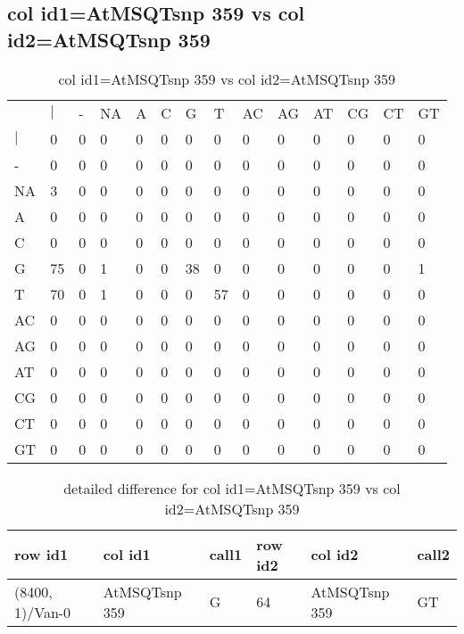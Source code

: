 \subsection{col id1=AtMSQTsnp 359 vs col id2=AtMSQTsnp 359}
\begin{center}
\begin{longtable}{|l|l|l|l|l|l|l|l|l|l|l|l|l|l|}
\caption{col id1=AtMSQTsnp 359 vs col id2=AtMSQTsnp 359} \label{table_dm686}\\
\hline
\\
\hline
&$|$&-&NA&A&C&G&T&AC&AG&AT&CG&CT&GT\\
$|$&0&0&0&0&0&0&0&0&0&0&0&0&0\\
-&0&0&0&0&0&0&0&0&0&0&0&0&0\\
NA&3&0&0&0&0&0&0&0&0&0&0&0&0\\
A&0&0&0&0&0&0&0&0&0&0&0&0&0\\
C&0&0&0&0&0&0&0&0&0&0&0&0&0\\
G&75&0&1&0&0&38&0&0&0&0&0&0&1\\
T&70&0&1&0&0&0&57&0&0&0&0&0&0\\
AC&0&0&0&0&0&0&0&0&0&0&0&0&0\\
AG&0&0&0&0&0&0&0&0&0&0&0&0&0\\
AT&0&0&0&0&0&0&0&0&0&0&0&0&0\\
CG&0&0&0&0&0&0&0&0&0&0&0&0&0\\
CT&0&0&0&0&0&0&0&0&0&0&0&0&0\\
GT&0&0&0&0&0&0&0&0&0&0&0&0&0\\
\hline
\end{longtable}
\end{center}

\begin{center}
\begin{longtable}{|l|l|l|l|l|l|}
\caption{detailed difference for col id1=AtMSQTsnp 359 vs col id2=AtMSQTsnp 359} \label{table_dm687}\\
\hline
row id1&col id1&call1&row id2&col id2&call2\\
\hline
(8400, 1)/Van-0&AtMSQTsnp 359&G&64&AtMSQTsnp 359&GT\\
\hline
\end{longtable}
\end{center}

